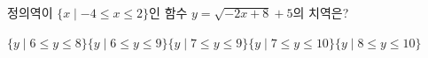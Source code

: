 \hspace*{2mm}\begin{minipage}[t]{\dimexpr\linewidth-2mm\relax}\vspace{0pt}
정의역이 $\{x \mid -4\le x\le 2\}$인 함수 $y=\sqrt{-2x+8}+5$의 치역은?
\begin{choicesii}{$\{y \mid 6\le y\le 8\}$}{$\{y \mid 6\le y\le 9\}$}{$\{y \mid 7\le y\le 9\}$}{$\{y \mid 7\le y\le 10\}$}{$\{y \mid 8\le y\le 10\}$}\end{choicesii}\end{minipage}
